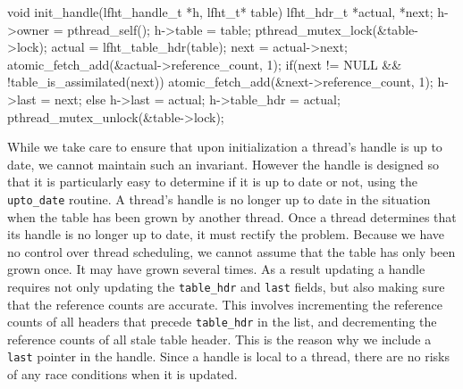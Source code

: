 \begin{center}
\begin{clisting}
void init_handle(lfht_handle_t *h, lfht_t* table){
  lfht_hdr_t *actual, *next;
  h->owner = pthread_self();
  h->table = table;
  pthread_mutex_lock(&table->lock);
  actual = lfht_table_hdr(table);
  next = actual->next;
  atomic_fetch_add(&actual->reference_count, 1);
  if(next != NULL && !table_is_assimilated(next)){
    atomic_fetch_add(&next->reference_count, 1);
    h->last = next;
  } else {
    h->last = actual;
  }
  h->table_hdr = actual;
  pthread_mutex_unlock(&table->lock);
}
\end{clisting}
\end{center}

While we take care to ensure that upon initialization a thread's
handle is up to date, we cannot maintain such an invariant. However
the handle is designed so that it is particularly easy to determine if
it is up to date or not, using the \texttt{upto\_date} routine.  A
thread's handle is no longer up to date in the situation when the
table has been grown by another thread.  Once a thread determines that
its handle is no longer up to date, it must rectify the problem. 
Because we have no control over thread scheduling, we cannot 
assume that the table has only been grown once. It may have grown several times.
As a result updating a handle requires not only updating the
\texttt{table\_hdr} and \texttt{last} fields, but also making sure
that the reference counts are accurate. This involves incrementing the
reference counts of all headers that precede \texttt{table\_hdr} in
the list, and decrementing the reference counts of all stale table
header.  This is the reason why we include a \texttt{last} pointer in the handle.
Since a handle is local to a thread, there are no risks of any race
conditions when it is updated.

